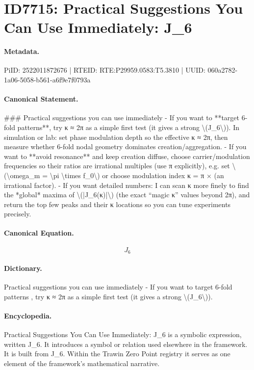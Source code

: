 \section*{ID7715: Practical Suggestions You Can Use Immediately: J\_6}
\paragraph{Metadata.}
PiID: 2522011872676 | RTEID: RTE:P29959.0583:T5.3810 | UUID: 060a2782-1a06-5058-b561-a6f9e7f0793a

\paragraph{Canonical Statement.}
\#\#\# Practical suggestions you can use immediately - If you want to **target 6-fold patterns**, try κ ≈ 2π as a simple first test (it gives a strong \textbackslash{}(J\_6\textbackslash{})). In simulation or lab: set phase modulation depth so the effective κ ≈ 2π, then measure whether 6-fold nodal geometry dominates creation/aggregation. - If you want to **avoid resonance** and keep creation diffuse, choose carrier/modulation frequencies so their ratios are irrational multiples (use π explicitly), e.g. set \textbackslash{}(\textbackslash{}omega\_m = \textbackslash{}pi \textbackslash{}times f\_0\textbackslash{}) or choose modulation index κ = π × (an irrational factor). - If you want detailed numbers: I can scan κ more finely to find the *global* maxima of \textbackslash{}(|J\_6(κ)|\textbackslash{}) (the exact “magic κ” values beyond 2π), and return the top few peaks and their κ locations so you can tune experiments precisely.

\paragraph{Canonical Equation.}
\[
J_6
\]

\paragraph{Dictionary.}
Practical suggestions you can use immediately - If you want to target 6-fold patterns , try κ ≈ 2π as a simple first test (it gives a strong \textbackslash{}(J\_6\textbackslash{})).

\paragraph{Encyclopedia.}
Practical Suggestions You Can Use Immediately: J\_6 is a symbolic expression, written J\_6. It introduces a symbol or relation used elsewhere in the framework. It is built from J\_6. Within the Trawin Zero Point registry it serves as one element of the framework's mathematical narrative.
